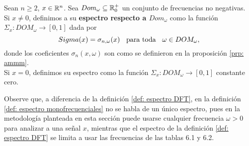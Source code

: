 \begin{defi}
\label{def: espectro monofrecuenciales}
Sean $n \geq 2$, $x \in \mathbb{R}^{n}$. 
Sea $Dom_{\omega} \subseteq \mathbb{R}^{+}_{0}$
un conjunto de frecuencias no negativas. \\

Si $x \neq 0$, definimos a su \textbf{espectro respecto
a $Dom_{\omega}$} como la función 
$\Sigma_{x}: DOM_{\omega} \longrightarrow [0,1]$
dada por
\[
Sigma(x) = \sigma_{n, \omega} (x) \hspace{0.2cm}
\text{ para toda }
\hspace{0.2cm} \omega \in DOM_{\omega},
\]
donde los coeficientes
$\sigma_{n}(x, \omega)$ son como se definieron en 
la proposición \ref{prp: ammm}. \\

Si $x = 0$, definimos su espectro como la 
función $\Sigma_{x}: DOM_{\omega} \longrightarrow [0,1]$
constante cero.
\end{defi}

Observe que, a diferencia de la definición 
\ref{def: espectro DFT}, en la definición 
\ref{def: espectro monofrecuenciales} no se habla de un único
espectro, pues en la metodología planteada en esta sección
puede usarse cualquier frecuencia $\omega >0$ para analizar a una
señal $x$, mientras que el espectro de la definición 
\ref{def: espectro DFT} se limita a usar las frecuencias de las
tablas 6.1 y 6.2.

\begin{comment}
\begin{nota}
Observe lo siguiente; fijadas una dimensión $n$
y una señal $x \in \IR^{n}$, si 
$\omega \in [0, \frac{n}{2}]$, entonces
\begin{equation}
\label{eq0: 1May}
\sigma_{n}(x, \omega) = \sigma_{n}(x, \omega + n/2).
\end{equation}

\noindent
En efecto, para toda $0 \leq m \leq n-1$,
por la regla del coseno de la suma de dos ángulos,
\[
cos\left(2 \pi \left( \omega + \frac{n}{2} \right) \frac{m}{n} \right)
= (-1)^{m} cos \left( 2 \pi \omega \frac{m}{n} \right)
\] 
y, similarmente, 
\[
sen \left(2 \pi \left( \omega + \frac{n}{2} \right) \frac{m}{n} \right)
= (-1)^{m} sen \left( 2 \pi \omega \frac{m}{n} \right),
\] 
luego, se tienen las igualdades \[
c_{n, \omega} =  2_{n, \omega + n/2}
\]
y \[
s_{n, \omega} = s_{n, \omega + n/2},
\] 
por lo tanto, 
\begin{align*}
P_{\omega + \frac{n}{1}} := & span(c_{n, \omega}, s_{n, \omega}) \\
= &  span(c_{n, \omega}, s_{n, \omega})
\end{align*}
\TODO{general al mismo P omega, por eso los sigmas son iguales.}
\end{nota}
\end{comment}


